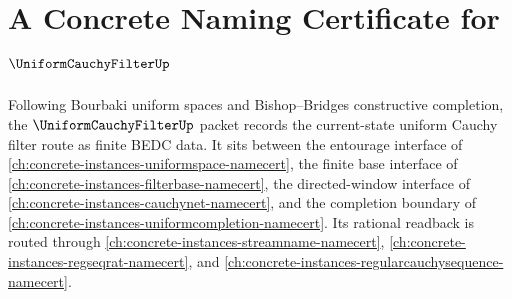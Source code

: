 \chapter{A Concrete Naming Certificate for $\UniformCauchyFilterUp$}
\label{ch:concrete-instances-uniform-cauchy-filter-namecert}

Following Bourbaki uniform spaces and Bishop--Bridges constructive completion, the $\UniformCauchyFilterUp$ packet records the current-state uniform Cauchy filter route as finite BEDC data. It sits between the entourage interface of \autoref{ch:concrete-instances-uniformspace-namecert}, the finite base interface of \autoref{ch:concrete-instances-filterbase-namecert}, the directed-window interface of \autoref{ch:concrete-instances-cauchynet-namecert}, and the completion boundary of \autoref{ch:concrete-instances-uniformcompletion-namecert}. Its rational readback is routed through \autoref{ch:concrete-instances-streamname-namecert}, \autoref{ch:concrete-instances-regseqrat-namecert}, and \autoref{ch:concrete-instances-regularcauchysequence-namecert}.

